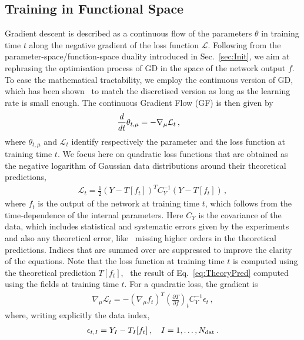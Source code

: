 \subsection{Training in Functional Space}
\label{sec:GradFlow}

Gradient descent is described as a continuous flow of the parameters $\theta$ in
training time $t$ along the negative gradient of the loss function
$\mathcal{L}$. Following from the parameter-space/function-space duality
introduced in Sec.~\ref{sec:Init}, we aim at rephrasing the optimisation process
of GD in the space of the network output $f$. To ease the mathematical
tractability, we employ the continuous version of GD, which has been
shown~\cite{barrett2022igr} to match the discretised version as long as the
learning rate is small enough. The continuous Gradient Flow (GF) is then given
by
\begin{align}
    \label{eq:GradientFlowDef}
    \frac{d}{dt} &\theta_{t,\mu} = -\nabla_\mu \mathcal{L}_t\, ,
\end{align}
where $\theta_{t,\mu}$ and $\mathcal{L}_t$ identify respectively the parameter
and the loss function at training time $t$. We focus here on quadratic loss
functions that are obtained as the negative logarithm of Gaussian data
distributions around their theoretical predictions,
\begin{align}
    \label{eq:QuadLoss}
    \mathcal{L}_t = \frac12 \left(Y - T[f_t]\right)^T C_Y^{-1} \left(Y - T[f_t]\right)\, ,
\end{align}
where $f_t$ is the output of the network at training time $t$, which follows
from the time-dependence of the internal parameters. Here $C_Y$ is the
covariance of the data, which includes statistical and systematic errors given
by the experiments and also any theoretical error, like \eg\ missing higher
orders in the theoretical predictions. Indices that are summed over are
suppressed to improve the clarity of the equations. Note that the loss function
at training time $t$ is computed using the theoretical prediction $T[f_t]$, \ie\
the result of Eq.~\eqref{eq:TheoryPred} computed using the fields at training
time $t$. For a quadratic loss, the gradient is
\begin{align}
    \nabla_\mu \mathcal{L}_t = - \left(\nabla_\mu f_t\right)^T \left(\frac{\partial T}{\partial f}\right)_t
      C_Y^{-1} \epsilon_t\, ,
\end{align}
where, writing explicitly the data index,
\begin{align}
    \label{eq:EpsDef}
    \epsilon_{t,I} = Y_I - T_I[f_t]\, , \quad I=1, \ldots, N_{\mathrm{dat}}\, .
\end{align}

